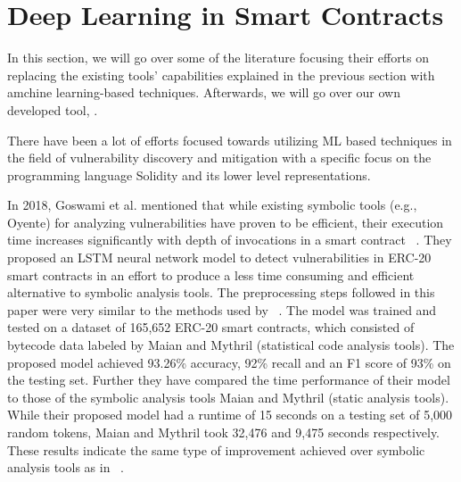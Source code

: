 \section{Deep Learning in Smart Contracts} \label{sec:dl-models}

In this section, we will go over some of the literature focusing their efforts on replacing the existing tools' capabilities explained in the previous section with amchine learning-based techniques. Afterwards, we will go over our own developed tool, \slithersimil.

There have been a lot of efforts focused towards utilizing ML based techniques in the field of vulnerability discovery and mitigation with a specific focus on the programming language Solidity and its lower level representations.

In 2018, Goswami et al. mentioned that while existing symbolic tools (e.g., Oyente) for analyzing vulnerabilities have proven to be efficient, their execution time increases significantly with depth of invocations in a smart contract ~\cite{grech2019gigahorse}.
They proposed an LSTM neural network model to detect vulnerabilities in ERC-20 smart contracts in an effort to produce a less time consuming and efficient alternative to symbolic analysis tools.
The preprocessing steps followed in this paper were very similar to the methods used by ~\cite{madmax}.
The model was trained and tested on a dataset of 165,652 ERC-20 smart contracts, which consisted of bytecode data labeled by Maian and Mythril (statistical code analysis tools).
The proposed model achieved 93.26\% accuracy, 92\% recall and an F1 score of 93\% on the testing set.
Further they have compared the time performance of their model to those of the symbolic analysis tools Maian and Mythril (static analysis tools).
While their proposed model had a runtime of 15 seconds on a testing set of 5,000 random tokens, Maian and Mythril took 32,476 and 9,475 seconds respectively.
These results indicate the same type of improvement achieved over symbolic analysis tools as in ~\cite{grech2019gigahorse}.

